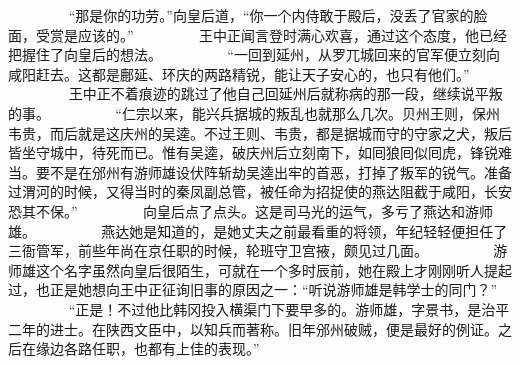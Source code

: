 　　
　　“那是你的功劳。”向皇后道，“你一个内侍敢于殿后，没丢了官家的脸面，受赏是应该的。”
　　
　　王中正闻言登时满心欢喜，通过这个态度，他已经把握住了向皇后的想法。
　　
　　“一回到延州，从罗兀城回来的官军便立刻向咸阳赶去。这都是鄜延、环庆的两路精锐，能让天子安心的，也只有他们。”
　　
　　王中正不着痕迹的跳过了他自己回延州后就称病的那一段，继续说平叛的事。
　　
　　“仁宗以来，能兴兵据城的叛乱也就那么几次。贝州王则，保州韦贵，而后就是这庆州的吴逵。不过王则、韦贵，都是据城而守的守家之犬，叛后皆坐守城中，待死而已。惟有吴逵，破庆州后立刻南下，如囘狼囘似囘虎，锋锐难当。要不是在邠州有游师雄设伏阵斩劫吴逵出牢的首恶，打掉了叛军的锐气。准备过渭河的时候，又得当时的秦凤副总管，被任命为招捉使的燕达阻截于咸阳，长安恐其不保。”
　　
　　向皇后点了点头。这是司马光的运气，多亏了燕达和游师雄。
　　
　　燕达她是知道的，是她丈夫之前最看重的将领，年纪轻轻便担任了三衙管军，前些年尚在京任职的时候，轮班守卫宫掖，颇见过几面。
　　
　　游师雄这个名字虽然向皇后很陌生，可就在一个多时辰前，她在殿上才刚刚听人提起过，也正是她想向王中正征询旧事的原因之一：“听说游师雄是韩学士的同门？”
　　
　　“正是！不过他比韩冈投入横渠门下要早多的。游师雄，字景书，是治平二年的进士。在陕西文臣中，以知兵而著称。旧年邠州破贼，便是最好的例证。之后在缘边各路任职，也都有上佳的表现。”

